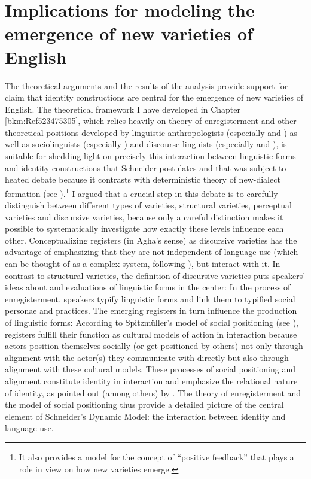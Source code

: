 \section{Implications for modeling the emergence of new varieties of English}
\label{bkm:Ref13994429}\hypertarget{Toc63021253}{}
The theoretical arguments and the results of the analysis provide support for  claim that identity constructions are central for the emergence of new varieties of English. The theoretical framework I have developed in Chapter \ref{bkm:Ref523475305}, which relies heavily on  theory of enregisterment and other theoretical positions developed by linguistic anthropologists (especially \citealt{Silverstein2003, Silverstein2016} and \citealt{Bucholtz2005}) as well as sociolinguists (especially \citealt{Eckert2008, Eckert2014}) and discourse-linguists (especially \citealt{Spitzmuller2011} and \citealt{Spitzmuller2013}), is suitable for shedding light on precisely this interaction between linguistic forms and identity constructions that Schneider postulates and that was subject to heated debate because it contrasts with  deterministic theory of new-dialect formation (see ).\footnote{It also provides a model for the concept of “positive feedback” that plays a role in  view on how new varieties emerge.} I argued that a crucial step in this debate is to carefully distinguish between different types of varieties, structural varieties, perceptual varieties and discursive varieties, because only a careful distinction makes it possible to systematically investigate how exactly these levels influence each other. Conceptualizing registers (in Agha’s sense) as discursive varieties has the advantage of emphasizing that they are not independent of language use (which can be thought of as a complex system, following \citealt{Kretzschmar2015b}), but interact with it. In contrast to structural varieties, the definition of discursive varieties puts speakers’ ideas about and evaluations of linguistic forms in the center: In the process of enregisterment, speakers typify linguistic forms and link them to typified social personae and practices. The emerging registers in turn influence the production of linguistic forms: According to Spitzmüller’s model of social positioning (see ), registers fulfill their function as cultural models of action in interaction because actors position themselves socially (or get positioned by others) not only through alignment with the actor(s) they communicate with directly but also through alignment with these cultural models. These processes of social positioning and alignment constitute identity in interaction and emphasize the relational nature of identity, as pointed out (among others) by \citet{Bucholtz2005}. The theory of enregisterment and the model of social positioning thus provide a detailed picture of the central element of Schneider’s Dynamic Model: the interaction between identity and language use.


